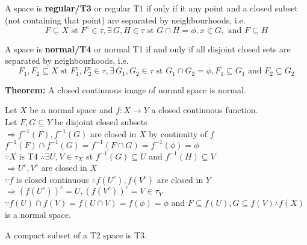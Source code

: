 \documentclass{article}
\begin{document}
A space is \textbf{regular/T3} or regular T1 if only if it any point and a closed subset (not containing that point) are separated by neighbourhoods, i.e.
$$F \subseteq X \text{ st } F^c \in \tau, \exists \, G,H \in \tau \text{ st } G \cap H = \phi, x \in G, \text{ and } F \subseteq H$$

A space is \textbf{normal/T4} or normal T1 if and only if all disjoint closed sets are separated by neighbourhoods, i.e.
$$F_1, F_2 \subseteq X \text{ st } F_1^c, F_2^c \in \tau, \exists \, G_1,G_2 \in \tau \text{ st } G_1 \cap G_2 = \phi, F_1 \subseteq G_1 \text{ and } F_2 \subseteq G_2$$

\textbf{Theorem:} A closed continuous image of normal space is normal.
\begin{tcolorbox}[colback=lightgray!10,colframe=lightgray!10, fontupper=\linespread{1.5}\selectfont]
	Let $X$ be a normal space and $f: X \rightarrow Y$ a closed continuous function. \\
	Let $F,G \subseteq Y$ be disjoint closed subsets \\
	$\Rightarrow f^{-1}(F), f^{-1}(G)$ are closed in $X$ by continuity of $f$ \\
	$f^{-1}(F) \cap f^{-1}(G) = f^{-1}(F \cap G) = f^{-1}(\phi) = \phi$ \\
	$\because X$ is T4 $\therefore \exists U,V \in \tau_X$ st $f^{-1}(G) \subseteq U$ and $f^{-1}(H) \subseteq V$ \\
	$\Rightarrow U^c, V^c$ are closed in $X$ \\
	$\because f$ is closed continuous $\therefore f(U^c), f(V^c)$ are closed in $Y$ \\
	$\Rightarrow (f(U^c))^c = U, (f(V^c))^c=V \in \tau_Y$ \\
	$\because f(U) \cap f(V) = f(U \cap V) = f(\phi) = \phi$ and $F \subseteq f(U), G \subseteq f(V) \therefore f(X)$ is a normal space.
\end{tcolorbox}

A compact subset of a T2 space is T3.
\end{document}
